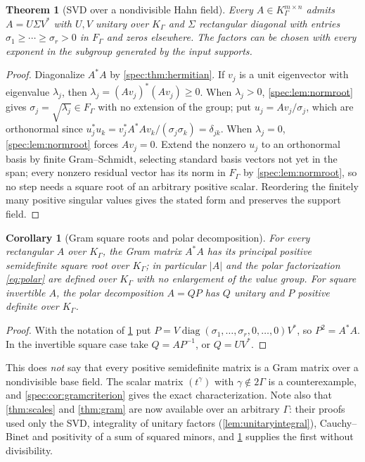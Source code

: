 \documentclass[11pt,a4paper]{article}
\numberwithin{equation}{section}
\newtheorem{theorem}{Theorem}[section]
\newtheorem{corollary}[corollary]{Corollary}
\theoremstyle{definition}
\theoremstyle{remark}
\newcommand{\diag}{\operatorname{diag}}
\begin{document}
\begin{theorem}[SVD over a nondivisible Hahn field]\label{spec:thm:svd}
Every $A\in K_\Gamma^{m\times n}$ admits $A=U\Sigma V^*$ with $U,V$ unitary
over $K_\Gamma$ and $\Sigma$ rectangular diagonal with entries
$\sigma_1\ge\cdots\ge\sigma_r>0$ in $F_\Gamma$ and zeros elsewhere. The
factors can be chosen with every exponent in the subgroup generated by the
input supports.
\end{theorem}
\begin{proof}
Diagonalize $A^*A$ by \cref{spec:thm:hermitian}. If $v_j$ is a unit
eigenvector with eigenvalue $\lambda_j$, then
$\lambda_j=(Av_j)^*(Av_j)\ge0$. When $\lambda_j>0$,
\cref{spec:lem:normroot} gives $\sigma_j=\sqrt{\lambda_j}\in F_\Gamma$ with
no extension of the group; put $u_j=Av_j/\sigma_j$, which are orthonormal
since $u_j^*u_k=v_j^*A^*Av_k/(\sigma_j\sigma_k)=\delta_{jk}$. When
$\lambda_j=0$, \cref{spec:lem:normroot} forces $Av_j=0$. Extend the nonzero
$u_j$ to an orthonormal basis by finite Gram--Schmidt, selecting standard
basis vectors not yet in the span; every nonzero residual vector has its
norm in $F_\Gamma$ by \cref{spec:lem:normroot}, so no step needs a square
root of an arbitrary positive scalar. Reordering the finitely many positive
singular values gives the stated form and preserves the support field.
\end{proof}

\begin{corollary}[Gram square roots and polar decomposition]\label{spec:cor:gramroot}
For every rectangular $A$ over $K_\Gamma$, the Gram matrix $A^*A$ has its
principal positive semidefinite square root over $K_\Gamma$; in particular
$|A|$ and the polar factorization \eqref{eq:polar} are defined over
$K_\Gamma$ with no enlargement of the value group. For square invertible
$A$, the polar decomposition $A=QP$ has $Q$ unitary and $P$ positive
definite over $K_\Gamma$.
\end{corollary}
\begin{proof}
With the notation of \cref{spec:thm:svd} put
$P=V\diag(\sigma_1,\ldots,\sigma_r,0,\ldots,0)V^*$, so $P^2=A^*A$. In the
invertible square case take $Q=AP^{-1}$, or $Q=UV^*$.
\end{proof}

This does \emph{not} say that every positive semidefinite matrix is a Gram
matrix over a nondivisible base field. The scalar matrix $(t^\gamma)$ with
$\gamma\notin2\Gamma$ is a counterexample, and
\cref{spec:cor:gramcriterion} gives the exact characterization. Note also
that \cref{thm:scales} and \cref{thm:gram} are now available over an
arbitrary $\Gamma$: their proofs used only the SVD, integrality of unitary
factors (\cref{lem:unitaryintegral}), Cauchy--Binet and positivity of a sum
of squared minors, and \cref{spec:thm:svd} supplies the first without
divisibility.
\end{document}

